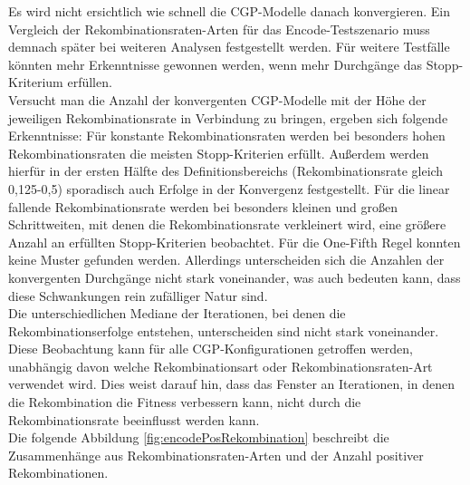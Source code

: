 Es wird nicht ersichtlich wie schnell die CGP-Modelle danach konvergieren.
Ein Vergleich der Rekombinationsraten-Arten für das Encode-Testszenario muss demnach später bei weiteren Analysen festgestellt werden.
Für weitere Testfälle könnten mehr Erkenntnisse gewonnen werden, wenn mehr Durchgänge das Stopp-Kriterium erfüllen.\\
Versucht man die Anzahl der konvergenten CGP-Modelle mit der Höhe der jeweiligen Rekombinationsrate in Verbindung zu bringen, ergeben sich folgende Erkenntnisse: Für konstante Rekombinationsraten werden bei besonders hohen Rekombinationsraten die meisten Stopp-Kriterien erfüllt. 
Außerdem werden hierfür in der ersten Hälfte des Definitionsbereichs (Rekombinationsrate gleich 0,125-0,5) sporadisch auch Erfolge in der Konvergenz festgestellt.
Für die linear fallende Rekombinationsrate werden bei besonders kleinen und großen Schrittweiten, mit denen die Rekombinationsrate verkleinert wird, eine größere Anzahl an erfüllten Stopp-Kriterien beobachtet.
Für die One-Fifth Regel konnten keine Muster gefunden werden.
Allerdings unterscheiden sich die Anzahlen der konvergenten Durchgänge nicht stark voneinander, was auch bedeuten kann, dass diese Schwankungen rein zufälliger Natur sind.\\
Die unterschiedlichen Mediane der Iterationen, bei denen die Re\-kom\-bi\-na\-tions\-er\-folge entstehen, unterscheiden sind nicht stark voneinander.
Diese Beobachtung kann für alle CGP-Konfigurationen getroffen werden, unabhängig davon welche Rekombinationsart oder Re\-kom\-bi\-na\-tions\-ra\-ten-Art verwendet wird.
Dies weist darauf hin, dass das Fenster an Iterationen, in denen die Rekombination die Fitness verbessern kann, nicht durch die Rekombinationsrate beeinflusst werden kann.\\
Die folgende Abbildung \ref{fig:encodePosRekombination} beschreibt die Zusammenhänge aus Rekombinationsraten-Arten und der Anzahl positiver Rekombinationen.

